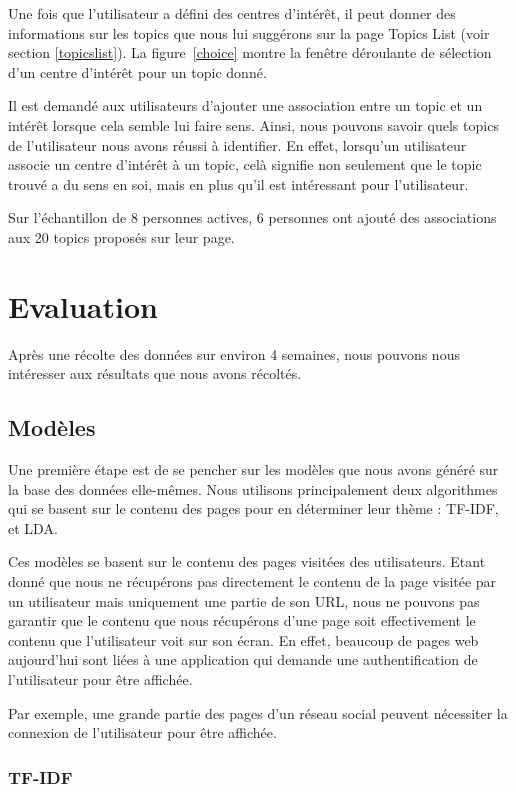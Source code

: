 			Une fois que l'utilisateur a défini des centres d'intérêt, il peut donner des informations sur les topics que nous lui suggérons sur la page Topics List (voir section \ref{topicslist}). La figure~\ref{choice} montre la fenêtre déroulante de sélection d'un centre d'intérêt pour un topic donné.

			Il est demandé aux utilisateurs d'ajouter une association entre un topic et un intérêt lorsque cela semble lui faire sens. Ainsi, nous pouvons savoir quels topics de l'utilisateur nous avons réussi à identifier. En effet, lorsqu'un utilisateur associe un centre d'intérêt à un topic, celà signifie non seulement que le topic trouvé a du sens en soi, mais en plus qu'il est intéressant pour l'utilisateur.

			Sur l'échantillon de 8 personnes actives, 6 personnes ont ajouté des associations aux 20 topics proposés sur leur page. 

\section{Evaluation}

	Après une récolte des données sur environ 4 semaines, nous pouvons nous intéresser aux résultats que nous avons récoltés.

	\subsection{Modèles}

		Une première étape est de se pencher sur les modèles que nous avons généré sur la base des données elle-mêmes. Nous utilisons principalement deux algorithmes qui se basent sur le contenu des pages pour en déterminer leur thème : TF-IDF, et LDA.

		Ces modèles se basent sur le contenu des pages visitées des utilisateurs. Etant donné que nous ne récupérons pas directement le contenu de la page visitée par un utilisateur mais uniquement une partie de son URL, nous ne pouvons pas garantir que le contenu que nous récupérons d'une page soit effectivement le contenu que l'utilisateur voit sur son écran. En effet, beaucoup de pages web aujourd'hui sont liées à une application qui demande une authentification de l'utilisateur pour être affichée.

		Par exemple, une grande partie des pages d'un réseau social peuvent nécessiter la connexion de l'utilisateur pour être affichée.

		\subsubsection{TF-IDF}

